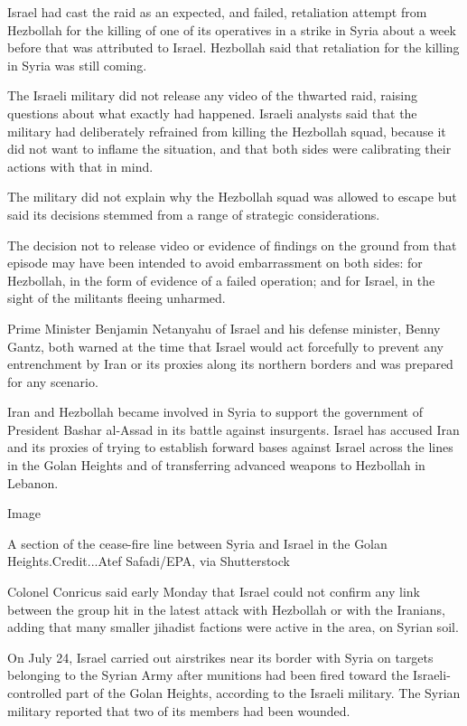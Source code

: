 Israel had cast the raid as an expected, and failed, retaliation attempt
from Hezbollah for the killing of one of its operatives in a strike in
Syria about a week before that was attributed to Israel. Hezbollah said
that retaliation for the killing in Syria was still coming.

The Israeli military did not release any video of the thwarted raid,
raising questions about what exactly had happened. Israeli analysts said
that the military had deliberately refrained from killing the Hezbollah
squad, because it did not want to inflame the situation, and that both
sides were calibrating their actions with that in mind.

The military did not explain why the Hezbollah squad was allowed to
escape but said its decisions stemmed from a range of strategic
considerations.

The decision not to release video or evidence of findings on the ground
from that episode may have been intended to avoid embarrassment on both
sides: for Hezbollah, in the form of evidence of a failed operation; and
for Israel, in the sight of the militants fleeing unharmed.

Prime Minister Benjamin Netanyahu of Israel and his defense minister,
Benny Gantz, both warned at the time that Israel would act forcefully to
prevent any entrenchment by Iran or its proxies along its northern
borders and was prepared for any scenario.

Iran and Hezbollah became involved in Syria to support the government of
President Bashar al-Assad in its battle against insurgents. Israel has
accused Iran and its proxies of trying to establish forward bases
against Israel across the lines in the Golan Heights and of transferring
advanced weapons to Hezbollah in Lebanon.

Image

A section of the cease-fire line between Syria and Israel in the Golan
Heights.Credit...Atef Safadi/EPA, via Shutterstock

Colonel Conricus said early Monday that Israel could not confirm any
link between the group hit in the latest attack with Hezbollah or with
the Iranians, adding that many smaller jihadist factions were active in
the area, on Syrian soil.

On July 24, Israel carried out airstrikes near its border with Syria on
targets belonging to the Syrian Army after munitions had been fired
toward the Israeli-controlled part of the Golan Heights, according to
the Israeli military. The Syrian military reported that two of its
members had been wounded.

